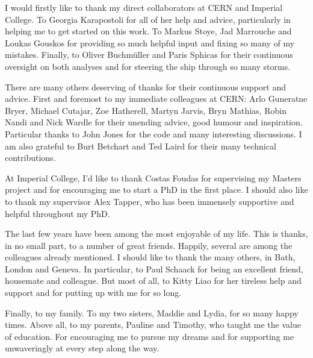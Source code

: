 \begin{acknowledgements}
   I would firstly like to thank my direct collaborators at
  \ac{CERN} and Imperial College. To Georgia Karapostoli for all of her help and
  advice, particularly in helping me to get started on this work. To Markus
  Stoye, Jad Marrouche and Loukas Gouskos for providing so much helpful input
  and fixing so many of my mistakes. Finally, to Oliver Buchm\"{u}ller and Paris
  Sphicas for their continuous oversight on both analyses and for steering the
  ship through so many storms.

  There are many others deserving of thanks for their continuous support and
  advice. First and foremost to my immediate colleagues at \ac{CERN}: Arlo
  Guneratne Bryer, Michael Cutajar, Zoe Hatherell, Martyn Jarvis, Bryn Mathias,
  Robin Nandi and Nick Wardle for their unending advice, good humour and
  inspiration. Particular thanks to John Jones for the  code and many
  interesting discussions. I am also grateful to Burt Betchart and Ted Laird for
  their many technical contributions.

  At Imperial College, I'd like to thank Costas Foudas for supervising my
  Masters project and for encouraging me to start a PhD in the first place.  I
  should also like to thank my supervisor Alex Tapper, who has been immensely
  supportive and helpful throughout my PhD.

  The last few years have been among the most enjoyable of my life. This is
  thanks, in no small part, to a number of great friends. Happily, several are
  among the colleagues already mentioned. I should like to thank the many
  others, in Bath, London and Geneva. In particular, to Paul Schaack for being
  an excellent friend, housemate and colleague. But most of all, to Kitty Liao
  for her tireless help and support and for putting up with me for so long.

  Finally, to my family. To my two sisters, Maddie and Lydia, for so many happy
  times. Above all, to my parents, Pauline and Timothy, who taught me the value
  of education. For encouraging me to pursue my dreams and for supporting me
  unwaveringly at every step along the way.
\end{acknowledgements}




\tableofcontents

\listoffigures
\listoftables

